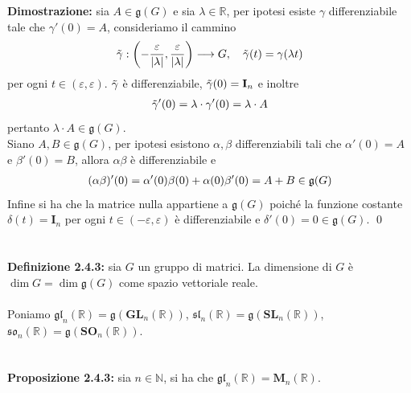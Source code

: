 \documentclass{article}
\begin{document}
\textbf{Dimostrazione:} sia $A \in \mathfrak{g}(G)$ e sia $\lambda \in \mathbb{R}$, per ipotesi esiste $\gamma$ differenziabile tale che $\gamma'(0) = A$, consideriamo il cammino
\begin{gather}
    \Tilde{\gamma} : \left( -\frac{\varepsilon}{|\lambda|}, \frac{\varepsilon}{|\lambda|} \right) \longrightarrow G, \quad \Tilde{\gamma}(t) = \gamma(\lambda t) \notag
\end{gather}
per ogni $t \in (\varepsilon, \varepsilon)$. $\Tilde{\gamma}$ è differenziabile, $\Tilde{\gamma}(0) = \mathbf{I}_n$ e inoltre
\begin{gather}
    \Tilde{\gamma}'(0) = \lambda \cdot \gamma'(0) = \lambda \cdot A \notag
\end{gather}
pertanto $\lambda \cdot A \in \mathfrak{g}(G)$. \\
Siano $A, B \in \mathfrak{g}(G)$, per ipotesi esistono $\alpha, \beta$ differenziabili tali che $\alpha'(0) = A$ e $\beta'(0) = B$, allora $\alpha\beta$ è differenziabile e
\begin{gather}
    (\alpha\beta)'(0) = \alpha'(0)\beta(0) + \alpha(0)\beta'(0) = A + B \in \mathfrak{g}(G) \notag
\end{gather}
Infine si ha che la matrice nulla appartiene a $\mathfrak{g}(G)$ poiché la funzione costante $\delta(t) = \mathbf{I}_n$ per ogni $t \in (-\varepsilon, \varepsilon)$ è differenziabile e $\delta'(0) = 0 \in \mathfrak{g}(G)$. \qed \\ \\ \\
\textbf{Definizione 2.4.3:} sia $G$ un gruppo di matrici. La dimensione di $G$ è $\dim G = \dim \mathfrak{g}(G)$ come spazio vettoriale reale. \\ \\
Poniamo $\mathfrak{gl}_n(\mathbb{R}) = \mathfrak{g}(\mathbf{GL}_n(\mathbb{R}))$, $\mathfrak{sl}_n(\mathbb{R}) = \mathfrak{g}(\mathbf{SL}_n(\mathbb{R}))$, $\mathfrak{so}_n(\mathbb{R}) = \mathfrak{g}(\mathbf{SO}_n(\mathbb{R}))$. \\ \\ \\
\textbf{Proposizione 2.4.3:} sia $n \in \mathbb{N}$, si ha che $\mathfrak{gl}_n(\mathbb{R}) = \mathbf{M}_n(\mathbb{R})$. \\
\end{document}
